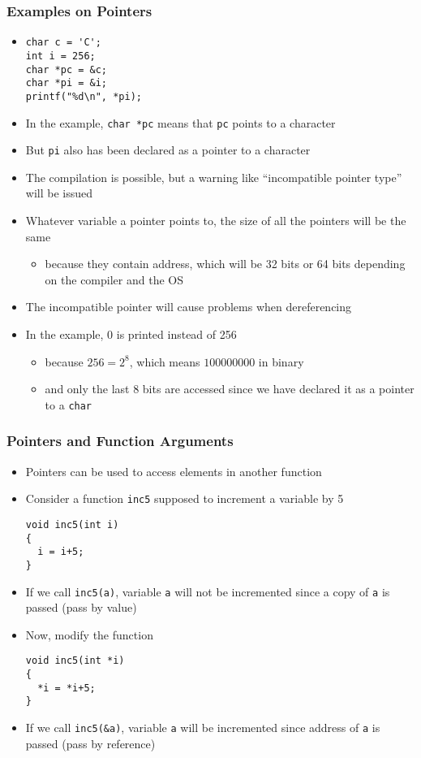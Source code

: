 \documentclass[11pt]{beamer}
\begin{document}
\begin{frame}[fragile]\frametitle{Examples on Pointers}
\label{sec-1-3}

\begin{itemize}
\item \begin{verbatim}
char c = 'C';
int i = 256;
char *pc = &c;
char *pi = &i;
printf("%d\n", *pi);
\end{verbatim}
\item In the example, \verb~char *pc~ means that \verb~pc~ points to a character
\item But \verb~pi~ also has been declared as a pointer to a character
\item The compilation is possible, but a warning like ``incompatible pointer type'' will be issued
\item Whatever variable a pointer points to, the size of all the pointers will be the same
\begin{itemize}
\item because they contain address, which will be 32 bits or 64 bits depending on the compiler and the OS
\end{itemize}
\item The incompatible pointer will cause problems when dereferencing
\item In the example, 0 is printed instead of 256
\begin{itemize}
\item because $256=2^8$, which means $100000000$ in binary
\item and only the last 8 bits are accessed since we have declared it as a pointer to a \verb~char~
\end{itemize}
\end{itemize}
\end{frame}
\begin{frame}[fragile]\frametitle{Pointers and Function Arguments}
\label{sec-1-4}

\begin{itemize}
\item Pointers can be used to access elements in another function
\item Consider a function \verb~inc5~ supposed to increment a variable by 5 

\begin{verbatim}
void inc5(int i)
{ 
  i = i+5;
}
\end{verbatim}
\item If we call \verb~inc5(a)~, variable \verb~a~ will not be incremented since a copy of \verb~a~ is passed (pass by value)
\item Now, modify the function

\begin{verbatim}
void inc5(int *i)
{ 
  *i = *i+5;
}
\end{verbatim}
\item If we call \verb~inc5(&a)~, variable \verb~a~ will be incremented since address of \verb~a~ is passed (pass by reference)
\end{itemize}
\end{frame}
\end{document}

